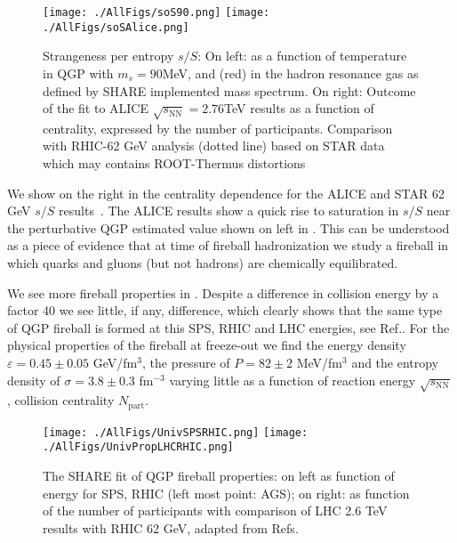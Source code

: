 \begin{figure}[tb]
\centering
\texttt{[image: ./AllFigs/soS90.png]}
\texttt{[image: ./AllFigs/soSAlice.png]}
\caption{Strangeness per entropy $s/S$: On left: as a function of temperature in QGP with $m_s=90$\;MeV, and (red) in the hadron resonance gas as defined by SHARE implemented mass spectrum. On right: Outcome of the fit to ALICE $\sqrt{s_\mathrm{NN}}=2.76$\;TeV results as a function of centrality, expressed by the number of participants. Comparison with RHIC-62 GeV analysis (dotted line) based on STAR data which may contains ROOT-Thermus distortions}
\label{sSFig}
\end{figure}

We show on the right in  the centrality dependence for the ALICE and STAR 62 GeV $s/S$ results~\cite{Petran:2013lja}. The ALICE results show a quick rise to saturation in $s/S$ near the perturbative QGP estimated value shown on left in . This can be understood as a piece of evidence that at time of fireball hadronization we study a fireball in which quarks and gluons (but not hadrons) are chemically equilibrated.

We see more fireball properties in . Despite a difference in collision energy by a factor 40 we see little, if any, difference, which clearly shows that the same type of QGP fireball is formed at this SPS, RHIC and LHC energies, see Ref.\cite{Petran:2013lja,Rafelski:2009jr,Rafelski:2014cqa,Petran:2013qla}. For the physical properties of the fireball at freeze-out we find the energy density $\varepsilon=0.45\pm 0.05$ GeV/fm$^3$, the pressure of $P=82\pm 2$ MeV/fm$^3$ and the entropy density of $\sigma=3.8\pm 0.3$ fm$^{-3}$ varying little as a function of reaction energy $\sqrt{s_\mathrm{NN}}$, collision centrality $N_\mathrm{part}$. 


\begin{figure}[!t]\sidecaption
\texttt{[image: ./AllFigs/UnivSPSRHIC.png]}
\texttt{[image: ./AllFigs/UnivPropLHCRHIC.png]}
\caption{The SHARE fit of QGP fireball properties: on left as function of energy for SPS, RHIC (left most point: AGS); on right: as function of the number of participants with comparison of LHC 2.6 TeV results with RHIC 62 GeV, adapted from Refs.\cite{Petran:2013lja,Rafelski:2009jr}}
\label{univRL}
\end{figure}


